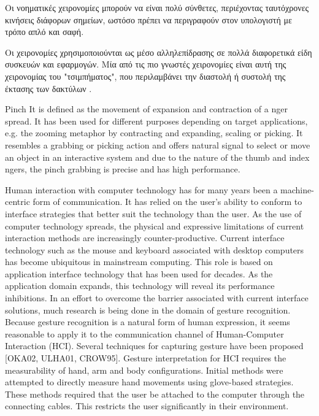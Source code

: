 Οι νοηματικές χειρονομίες μπορούν να είναι πολύ σύνθετες, περιέχοντας ταυτόχρονες κινήσεις διάφορων σημείων, ωστόσο πρέπει να περιγραφούν στον υπολογιστή με τρόπο απλό και σαφή.

Οι χειρονομίες χρησιμοποιούνται ως μέσο αλληλεπίδρασης σε πολλά διαφορετικά είδη συσκευών και εφαρμογών. Μία από τις πιο γνωστές χειρονομίες είναι αυτή της χειρονομίας του "τσιμπήματος", που περιλαμβάνει την διαστολή ή συστολή της έκτασης των δακτύλων \cite{hoggan2013multi}.


Pinch It is defined as the movement of expansion and contraction of a nger spread. It has been used for different purposes depending on target applications, e.g. the zooming metaphor by contracting and expanding, scaling or picking. It resembles a grabbing or picking action and offers natural signal to select or move an object in an interactive system and due to the nature of the thumb and index ngers, the pinch grabbing is precise and has high performance.


Human interaction with computer technology has for many years been a machine-centric form of communication. It has relied on the user’s ability to conform to interface strategies that better suit the technology than the user. As the use of computer technology spreads, the physical and expressive limitations of current interaction methods are increasingly counter-productive. Current interface technology such as the mouse and keyboard associated with desktop computers has become ubiquitous in mainstream computing. This role is based on application interface technology that has been used for decades. As the application domain expands, this technology will reveal its performance inhibitions. In an effort to overcome the barrier associated with current interface solutions, much research is being done in the domain of gesture recognition. Because gesture recognition is a natural form of human expression, it seems reasonable to apply it to the communication channel of Human-Computer Interaction (HCI). Several techniques for capturing gesture have been proposed [OKA02, ULHA01, CROW95]. Gesture interpretation for HCI requires the measurability of hand, arm and body configurations. Initial methods were attempted to directly measure hand movements using glove-based strategies. These methods required that the user be attached to the computer through the connecting cables. This restricts the user significantly in their environment.

